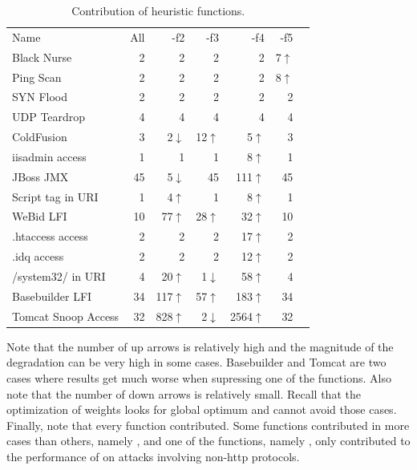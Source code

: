 \documentclass[sigconf,review, anonymous]{acmart}
\begin{document}
\setlength{\tabcolsep}{5pt}
\begin{table}[h!]
  \small
  \caption{\label{table:weights}Contribution of heuristic functions.}
  \vspace{-2ex}
  \centering
  \begin{tabular}{lrrrrrr}
    \toprule
    Name &
    All &
    -f2 &
    -f3 &    
    -f4 &
    -f5 \\ 
    Black Nurse & 2 & 2 & 2 & 2 & 7$\uparrow$ \\    
    Ping Scan & 2 & 2 & 2 & 2 &  8$\uparrow$\\
    SYN Flood & 2 & 2 & 2 & 2 & 2 \\
    UDP Teardrop & 4 & 4 & 4 & 4 & 4 \\


    ColdFusion & 3 & 2\cellcolor{lightgray}$\downarrow$ & 12$\uparrow$ & 5$\uparrow$ & 3 \\
    iisadmin access & 1 & 1 & 1 & 8$\uparrow$ & 1 \\        
    JBoss JMX & 45 & 5\cellcolor{lightgray}$\downarrow$ & 45 & 111$\uparrow$ & 45 \\
    Script tag in URI & 1 & 4$\uparrow$ & 1 & 8$\uparrow$ & 1 \\
    WeBid LFI & 10 & 77$\uparrow$ & 28$\uparrow$ & 32$\uparrow$ & 10 \\    
    .htaccess access & 2 & 2 & 2 & 17$\uparrow$ & 2 \\
    .idq access & 2 & 2 & 2 & 12$\uparrow$ & 2 \\
    /system32/ in URI & 4 & 20$\uparrow$ & 1\cellcolor{lightgray}$\downarrow$ & 58$\uparrow$ & 4 \\
    Basebuilder LFI & 34 & 117$\uparrow$ & 57$\uparrow$ & 183$\uparrow$ & 34 \\
    Tomcat Snoop Access & 32 & 828$\uparrow$ & 2\cellcolor{lightgray}$\downarrow$ & 2564$\uparrow$ & 32 \\
    \bottomrule
  \end{tabular}
\end{table}

Note that the number of up arrows is relatively high and the magnitude
of the degradation can be very high in some cases. Basebuilder and
Tomcat are two cases where results get much worse when supressing one
of the functions. Also note that the number of down arrows is
relatively small. Recall that the optimization of weights looks for
global optimum and cannot avoid those cases. Finally, note that every
function contributed. Some functions contributed in more cases than
others, namely , and one of the functions, namely ,
only contributed to the performance of \tname{} on attacks involving
non-http protocols.
\end{document}
